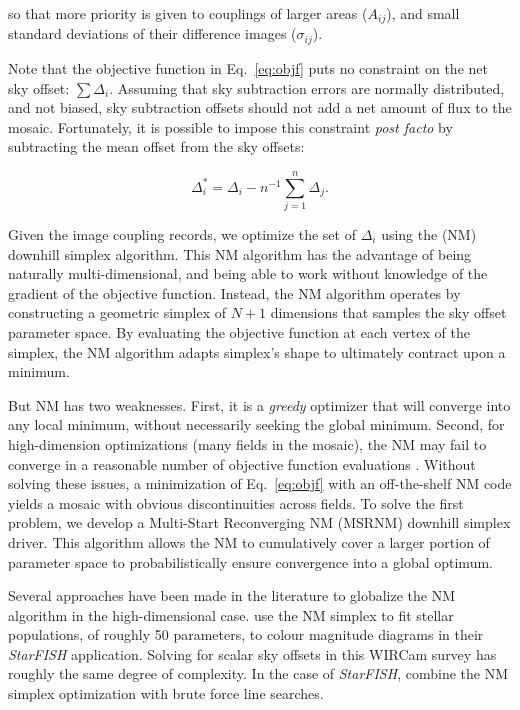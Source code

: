 \documentclass[iop]{emulateapj}
\newcommand{\sw}[1]{\textit{#1}} %
\newcommand{\Eq}[1]{Eq.~\ref{eq:#1}}  %
\begin{document}
\noindent so that more priority is given to couplings of larger areas ($A_{ij}$), and small standard deviations of their difference images ($\sigma_{ij}$).

Note that the objective function in \Eq{objf} puts no constraint on the net sky offset: $\sum \Delta_i$.
Assuming that sky subtraction errors are normally distributed, and not biased, sky subtraction offsets should not add a net amount of flux to the mosaic.
Fortunately, it is possible to impose this constraint \textit{post facto} by subtracting the mean offset from the sky offsets:

\begin{equation}
    \Delta_i^* = \Delta_i - n^{-1}\sum_{j=1}^n \Delta_j.
    \label{eq:netzero}
\end{equation}

Given the image coupling records, we optimize the set of $\Delta_i$ using the \cite{Nelder:1965} (NM) downhill simplex algorithm.
This NM algorithm has the advantage of being naturally multi-dimensional, and being able to work without knowledge of the gradient of the objective function.
Instead, the NM algorithm operates by constructing a geometric simplex of $N+1$ dimensions that samples the sky offset parameter space.
By evaluating the objective function at each vertex of the simplex, the NM algorithm adapts simplex's shape to ultimately contract upon a minimum.

But NM has two weaknesses.
First, it is a \emph{greedy} optimizer that will converge into any local minimum, without necessarily seeking the global minimum.
Second, for high-dimension optimizations (many fields in the mosaic), the NM may fail to converge in a reasonable number of objective function evaluations \citep{Neumann:2006}.
Without solving these issues, a minimization of \Eq{objf} with an off-the-shelf NM code yields a mosaic with obvious discontinuities across fields.
To solve the first problem, we develop a Multi-Start Reconverging NM (MSRNM) downhill simplex driver.
This algorithm allows the NM to cumulatively cover a larger portion of parameter space to probabilistically ensure convergence into a global optimum.

Several approaches have been made in the literature to globalize the NM algorithm in the high-dimensional case.
\cite{Harris:2001} use the NM simplex to fit stellar populations, of roughly 50 parameters, to colour magnitude diagrams in their \sw{StarFISH} application.
Solving for scalar sky offsets in this WIRCam survey has roughly the same degree of complexity.
In the case of \sw{StarFISH}, \citeauthor{Harris:2001} combine the NM simplex optimization with brute force line searches.
\end{document}
